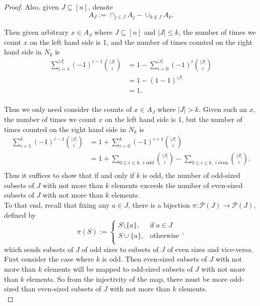 \documentclass{article}
\begin{document}
\begin{enumerate}[label={\bf Q\arabic*:}]
\begin{proof}
      Also, given $J\subseteq[n]$, denote
      \[A_J:=\cap_{j\in J}A_j -\cup_{k\not\in J}A_k.\]

      Then given arbitrary $x\in A_J$ where $J\subseteq[n]$ and $|J|\leq
      k$, the number of times we count $x$ on the left hand side is 1, and
      the number of times counted on the right hand side in $N_k$ is
      \begin{align*}
        \sum_{i=1}^{|J|} (-1)^{i-1}\binom{|J|}{i} &=1-\sum_{i=0}^{|J|}
          (-1)^{i}\binom{|J|}{i}\\
        &=1-(1-1)^{|J|}\\
        &=1.\\
      \end{align*}

      Thus we only need consider the counts of $x\in A_J$ where $|J|>k$.
      Given such an $x$, the number of times we count $x$ on the left hand
      side is 1, but the number of times counted on the right hand side in
      $N_k$ is
      \begin{align*}
        \sum_{i=1}^{k} (-1)^{i-1}\binom{|J|}{i} &=1+\sum_{i=0}^{k}
          (-1)^{i+1}\binom{|J|}{i}\\
        &=1 +\sum_{0\leq i\leq k,\; i\; \text{odd}} \binom{|J|}{i}
        -\sum_{0\leq i\leq k,\; i\; \text{even}} \binom{|J|}{i}.\\
      \end{align*}
      Thus it suffices to show that if and only if $k$ is
      odd, the number of odd-sized subsets of $J$
      with not more than $k$ elements exceeds the number of even-sized
      subsets of $J$ with not more than $k$ elements. \\

      To that end, recall that fixing any $a\in J$, there is a bijection
      $\pi:\mathcal{P}(J)\rightarrow\mathcal{P}(J)$, defined by
      \[\pi(S):=
        \begin{cases}
          S\setminus\{a\}, &\text{if}\; a\in J\\
          S\cup\{a\}, &\text{otherwise}\\
        \end{cases},\]
      which sends subsets of $J$ of odd sizes to subsets of $J$ of even
      sizes and vice-versa. \\

      First consider the case where $k$ is odd. Then even-sized subsets of
      $J$ with not more than $k$ elements will be mapped to odd-sized
      subsets of $J$ with not more than $k$ elements. So from the
      injectivity of the map, there must be more odd-sized than even-sized
      subsets of $J$ with not more than $k$ elements. \\


\end{proof}
\end{enumerate}
\end{document}
